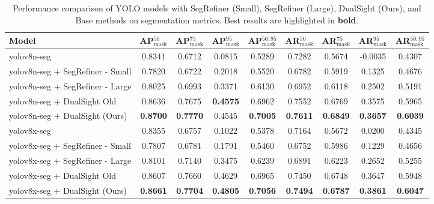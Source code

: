 
\begin{table*}[h!]
\centering
\begin{adjustbox}{width=\textwidth}
\begin{tabular}{@{}l|c|c|c|c|c|c|c|c@{}}
\toprule
\textbf{Model} & \textbf{AP$^{50}_{\text{mask}}$} & \textbf{AP$^{75}_{\text{mask}}$} & \textbf{AP$^{95}_{\text{mask}}$} & \textbf{AP$^{50:95}_{\text{mask}}$} & \textbf{AR$^{50}_{\text{mask}}$} & \textbf{AR$^{75}_{\text{mask}}$} & \textbf{AR$^{95}_{\text{mask}}$} & \textbf{AR$^{50:95}_{\text{mask}}$} \\ \midrule
yolov8n-seg & 0.8341 & 0.6712 & 0.0815 & 0.5289 & 0.7282 & 0.5674 & -0.0035 & 0.4307 \\ 
yolov8n-seg + SegRefiner - Small & 0.7820 & 0.6722 & 0.2018 & 0.5520 & 0.6782 & 0.5919 & 0.1325 & 0.4676 \\ 
yolov8n-seg + SegRefiner - Large & 0.8025 & 0.6993 & 0.3371 & 0.6130 & 0.6952 & 0.6118 & 0.2502 & 0.5191 \\ 
yolov8n-seg + DualSight Old & 0.8636 & 0.7675 & \textbf{0.4575} & 0.6962 & 0.7552 & 0.6769 & 0.3575 & 0.5965 \\ 
yolov8n-seg + DualSight (Ours) & \textbf{0.8700} & \textbf{0.7770} & 0.4545 & \textbf{0.7005} & \textbf{0.7611} & \textbf{0.6849} & \textbf{0.3657} & \textbf{0.6039} \\ 
\midrule
yolov8x-seg & 0.8355 & 0.6757 & 0.1022 & 0.5378 & 0.7164 & 0.5672 & 0.0200 & 0.4345 \\ 
yolov8x-seg + SegRefiner - Small & 0.7807 & 0.6781 & 0.1791 & 0.5460 & 0.6752 & 0.5986 & 0.1229 & 0.4656 \\ 
yolov8x-seg + SegRefiner - Large & 0.8101 & 0.7140 & 0.3475 & 0.6239 & 0.6891 & 0.6223 & 0.2652 & 0.5255 \\ 
yolov8x-seg + DualSight Old & 0.8607 & 0.7660 & 0.4629 & 0.6965 & 0.7450 & 0.6748 & 0.3647 & 0.5948 \\ 
yolov8x-seg + DualSight (Ours) & \textbf{0.8661} & \textbf{0.7704} & \textbf{0.4805} & \textbf{0.7056} & \textbf{0.7494} & \textbf{0.6787} & \textbf{0.3861} & \textbf{0.6047} \\ 

\bottomrule
\end{tabular}
\end{adjustbox}
\caption{Performance comparison of YOLO models with SegRefiner (Small), SegRefiner (Large), DualSight (Ours), and Base methods on segmentation metrics. Best results are highlighted in \textbf{bold}.}
\label{tab:performance_comparison}
\end{table*}
